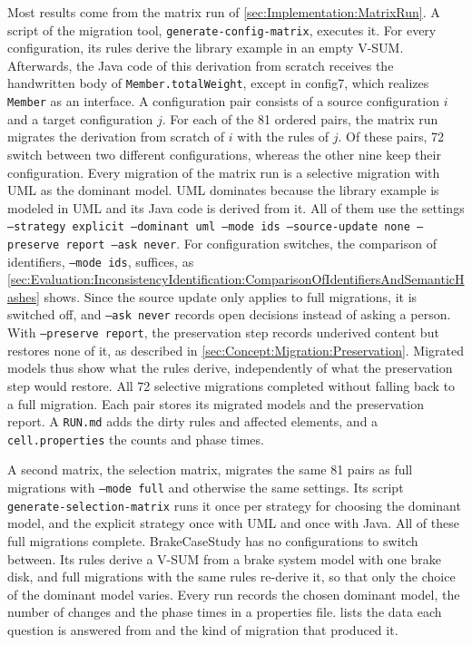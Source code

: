 Most results come from the matrix run of \autoref{sec:Implementation:MatrixRun}.
A script of the migration tool, \texttt{generate-config-matrix}, executes it.
For every configuration, its rules derive the library example in an empty V-SUM.
Afterwards, the Java code of this derivation from scratch receives the handwritten body of \texttt{Member.totalWeight}, except in config7, which realizes \texttt{Member} as an interface.
A configuration pair consists of a source configuration $i$ and a target configuration $j$.
For each of the 81 ordered pairs, the matrix run migrates the derivation from scratch of $i$ with the rules of $j$.
Of these pairs, 72 switch between two different configurations, whereas the other nine keep their configuration.
Every migration of the matrix run is a selective migration with UML as the dominant model.
UML dominates because the library example is modeled in UML and its Java code is derived from it.
All of them use the settings \texttt{--strategy explicit --dominant uml --mode ids --source-update none --preserve report --ask never}.
For configuration switches, the comparison of identifiers, \texttt{--mode ids}, suffices, as \autoref{sec:Evaluation:InconsistencyIdentification:ComparisonOfIdentifiersAndSemanticHashes} shows.
Since the source update only applies to full migrations, it is switched off, and \texttt{--ask never} records open decisions instead of asking a person.
With \texttt{--preserve report}, the preservation step records underived content but restores none of it, as described in \autoref{sec:Concept:Migration:Preservation}.
Migrated models thus show what the rules derive, independently of what the preservation step would restore.
All 72 selective migrations completed without falling back to a full migration.
Each pair stores its migrated models and the preservation report.
A \texttt{RUN.md} adds the dirty rules and affected elements, and a \texttt{cell.properties} the counts and phase times.

A second matrix, the selection matrix, migrates the same 81 pairs as full migrations with \texttt{--mode full} and otherwise the same settings.
Its script \texttt{generate-selection-matrix} runs it once per strategy for choosing the dominant model, and the explicit strategy once with UML and once with Java.
All of these full migrations complete.
BrakeCaseStudy has no configurations to switch between.
Its rules derive a V-SUM from a brake system model with one brake disk, and full migrations with the same rules re-derive it, so that only the choice of the dominant model varies.
Every run records the chosen dominant model, the number of changes and the phase times in a properties file.
 lists the data each question is answered from and the kind of migration that produced it.

